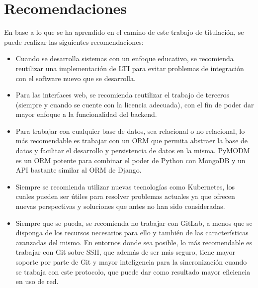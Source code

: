 \section{Recomendaciones}

En base a lo que se ha aprendido en el camino de este trabajo de titulación, se puede realizar las siguientes recomendaciones:

\begin{itemize}
  \item Cuando se desarrolla sistemas con un enfoque educativo, se recomienda reutilizar una implementación de LTI para evitar problemas de integración con el software nuevo que se desarrolla.
  \item Para las interfaces web, se recomienda reutilizar el trabajo de terceros (siempre y cuando se cuente con la licencia adecuada), con el fin de poder dar mayor enfoque a la funcionalidad del backend.
  \item Para trabajar con cualquier base de datos, sea relacional o no relacional, lo más recomendable es trabajar con un ORM que permita abstraer la base de datos y facilitar el desarrollo y persistencia de datos en la misma. PyMODM es un ORM potente para combinar el poder de Python con MongoDB y un API bastante similar al ORM de Django.
  \item Siempre se recomienda utilizar nuevas tecnologías como Kubernetes, los cuales pueden ser útiles para resolver problemas actuales ya que ofrecen nuevas perspectivas y soluciones que antes no han sido consideradas.
  \item Siempre que se pueda, se recomienda no trabajar con GitLab, a menos que se disponga de los recursos necesarios para ello y también de las características avanzadas del mismo. En entornos donde sea posible, lo más recomendable es trabajar con Git sobre SSH, que además de ser más seguro, tiene mayor soporte por parte de Git y mayor inteligencia para la sincronización cuando se trabaja con este protocolo, que puede dar como resultado mayor eficiencia en uso de red.
\end{itemize}

